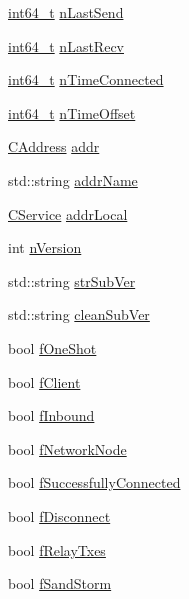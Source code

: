 \begin{DoxyCompactItemize}
\hyperlink{stdint_8h_adec1df1b8b51cb32b77e5b86fff46471}{int64\+\_\+t} \hyperlink{class_c_node_af39253ad525733ca64ab3fc785dfc4eb}{n\+Last\+Send}
\item 
\hyperlink{stdint_8h_adec1df1b8b51cb32b77e5b86fff46471}{int64\+\_\+t} \hyperlink{class_c_node_afb40f43a51ba686de93256727351af07}{n\+Last\+Recv}
\item 
\hyperlink{stdint_8h_adec1df1b8b51cb32b77e5b86fff46471}{int64\+\_\+t} \hyperlink{class_c_node_abb39393ef08cb5668ded6cb14cdbc147}{n\+Time\+Connected}
\item 
\hyperlink{stdint_8h_adec1df1b8b51cb32b77e5b86fff46471}{int64\+\_\+t} \hyperlink{class_c_node_a3079fadef397abbf7e8d444f4426ebe7}{n\+Time\+Offset}
\item 
\hyperlink{class_c_address}{C\+Address} \hyperlink{class_c_node_a3993ecb1de2a2135a3cf0904346a6f88}{addr}
\item 
std\+::string \hyperlink{class_c_node_a3155cd313d85ec3ff691f8259a5f5345}{addr\+Name}
\item 
\hyperlink{class_c_service}{C\+Service} \hyperlink{class_c_node_a1b6517682efa0709f44780a95384c4ec}{addr\+Local}
\item 
int \hyperlink{class_c_node_a99173eb3cef17e699ba21a5249ac33d2}{n\+Version}
\item 
std\+::string \hyperlink{class_c_node_afb24fb33019af5c4085412fe3898cf01}{str\+Sub\+Ver}
\item 
std\+::string \hyperlink{class_c_node_a05f0401427c5ffebd1ca404848e83ff7}{clean\+Sub\+Ver}
\item 
bool \hyperlink{class_c_node_a2bb91c9968a9f855c05b1121100a8797}{f\+One\+Shot}
\item 
bool \hyperlink{class_c_node_a721e2470c2c961b7599768a14be68781}{f\+Client}
\item 
bool \hyperlink{class_c_node_a64b2550ec558b6106ebc122d450ad35b}{f\+Inbound}
\item 
bool \hyperlink{class_c_node_a933adb2b192939545a01d602b1d7b53a}{f\+Network\+Node}
\item 
bool \hyperlink{class_c_node_ab58c1772b2698e348d86002f34254119}{f\+Successfully\+Connected}
\item 
bool \hyperlink{class_c_node_af2f7ea958313974e8a948292f060922e}{f\+Disconnect}
\item 
bool \hyperlink{class_c_node_ab387bb0c4ffd42e3f0aea233dca0e301}{f\+Relay\+Txes}
\item 
bool \hyperlink{class_c_node_aab66b45769e6c8009d224c63704a1859}{f\+Sand\+Storm}
\item 

\end{DoxyCompactItemize}

